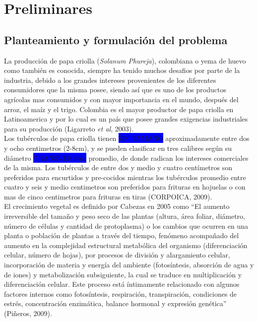 \chapter{Preliminares}

\section{Planteamiento y formulaci\'on del problema}

La producción de papa criolla (\textit{Solanum Phureja}), colombiana o yema de huevo como tambi\'en es conocida, siempre ha tenido muchos desafios por parte de la industria, debido a los grandes intereses provenientes de los diferentes consumidores que la misma posee, siendo así que es uno de los productos agr\'icolas mas consumidos y con mayor importancia en el mundo, despu\'es del arroz, el ma\'iz y el trigo. Colombia es el mayor productor de papa criolla en Latinoamerica y por lo cual es un pa\'is que posee grandes exigencias industriales para su producci\'on (Ligarreto \textit{et al}, 2003).\\

Los tub\'erculos de papa criolla tienen \colorbox{blue}{UN TAMA\~NO}  aproximadamente entre dos y ocho centimetros (2-8cm), y se pueden clasificar en tres calibres según su diámetro \colorbox{blue}{TRANSVERSAL} promedio,  de donde radican los intereses comerciales de la misma. Los tub\'erculos de entre dos y medio y cuatro cent\'imetros son preferidos para encurtidos y pre-cocidos mientras los tub\'erculos promedio entre cuatro y seis y medio centimetros son preferidos para frituras en hojuelas o con mas de cinco centimetros para frituras en tiras (CORPOICA, 2009).\\

El crecimiento vegetal es definido por Cabezas en 2005 como "`El aumento irreversible del tama\~no y peso seco de las plantas (altura, área foliar, diámetro, número de células y cantidad de protoplasma) o los cambios que ocurren en una planta o población de plantas a través del tiempo, fenómeno acompañado del aumento en la complejidad estructural metabólica del organismo (diferenciación celular, número de hojas), por procesos de división y alargamiento celular, incorporación de materia y energía del ambiente (fotosíntesis, absorción de agua y de iones) y metabolización subsiguiente, la cual se traduce en multiplicación y diferenciación celular. Este proceso está íntimamente relacionado con algunos factores internos como fotosíntesis, respiración, transpiración, condiciones de estrés, concentración enzimática, balance hormonal y expresión genética"' (Pi\~neros, 2009).\\

